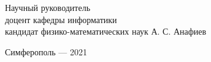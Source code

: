 \vspace*{4\baselineskip}

\begin{adjustwidth}{2em}{0pt}
\noindent
Научный руководитель\\
доцент кафедры информатики\\
кандидат физико-математических наук
\null\hfill А. С. Анафиев
\end{adjustwidth}

\vspace*{1\baselineskip}


\vfill

\begin{center} Симферополь --- 2021 \end{center}
\thispagestyle{empty} %
\restoregeometry